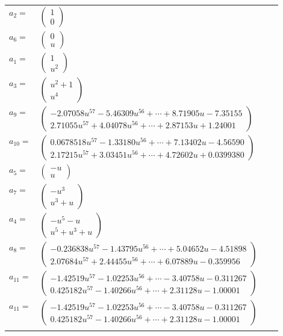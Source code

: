 \documentclass[1p]{elsarticle_modified}
\theoremstyle{definition}
\begin{document}
\begin{tabular}{m{7pt} m{180pt} m{7pt} m{180pt} }
\flushright $a_{2}=$&$\begin{pmatrix}1\\0\end{pmatrix}$ \\
\flushright $a_{6}=$&$\begin{pmatrix}0\\u\end{pmatrix}$ \\
\flushright $a_{1}=$&$\begin{pmatrix}1\\u^2\end{pmatrix}$ \\
\flushright $a_{3}=$&$\begin{pmatrix}u^2+1\\u^4\end{pmatrix}$ \\
\flushright $a_{9}=$&$\begin{pmatrix}-2.07058 u^{57}-5.46309 u^{56}+\cdots+8.71905 u-7.35155\\2.71055 u^{57}+4.04078 u^{56}+\cdots+2.87153 u+1.24001\end{pmatrix}$ \\
\flushright $a_{10}=$&$\begin{pmatrix}0.0678518 u^{57}-1.33180 u^{56}+\cdots+7.13402 u-4.56590\\2.17215 u^{57}+3.03451 u^{56}+\cdots+4.72602 u+0.0399380\end{pmatrix}$ \\
\flushright $a_{5}=$&$\begin{pmatrix}- u\\u\end{pmatrix}$ \\
\flushright $a_{7}=$&$\begin{pmatrix}- u^3\\u^3+u\end{pmatrix}$ \\
\flushright $a_{4}=$&$\begin{pmatrix}- u^5- u\\u^5+u^3+u\end{pmatrix}$ \\
\flushright $a_{8}=$&$\begin{pmatrix}-0.236838 u^{57}-1.43795 u^{56}+\cdots+5.04652 u-4.51898\\2.07684 u^{57}+2.44455 u^{56}+\cdots+6.07889 u-0.359956\end{pmatrix}$ \\
\flushright $a_{11}=$&$\begin{pmatrix}-1.42519 u^{57}-1.02253 u^{56}+\cdots-3.40758 u-0.311267\\0.425182 u^{57}-1.40266 u^{56}+\cdots+2.31128 u-1.00001\end{pmatrix}$\\ \flushright $a_{11}=$&$\begin{pmatrix}-1.42519 u^{57}-1.02253 u^{56}+\cdots-3.40758 u-0.311267\\0.425182 u^{57}-1.40266 u^{56}+\cdots+2.31128 u-1.00001\end{pmatrix}$\\&\end{tabular}
\end{document}
